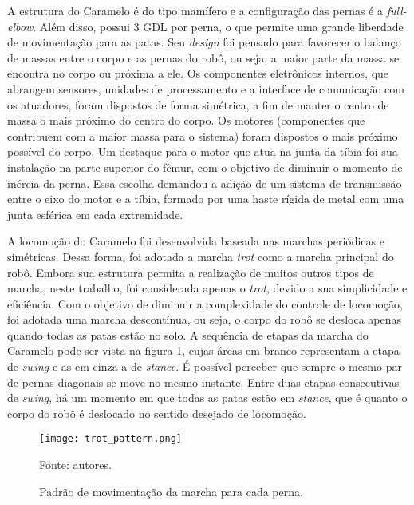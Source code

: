 \documentclass[conference]{IEEEtran}
\begin{document}
A estrutura do Caramelo é do tipo mamífero e a configuração das pernas é a \textit{full-elbow}. Além disso, possui 3 GDL por perna, o que permite uma grande liberdade de movimentação para as patas. Seu \textit{design} foi pensado para favorecer o balanço de massas entre o corpo e as pernas do robô, ou seja, a maior parte da massa se encontra no corpo ou próxima a ele. Os componentes eletrônicos internos, que abrangem sensores, unidades de processamento e a interface de comunicação com os atuadores, foram dispostos de forma simétrica, a fim de manter o centro de massa o mais próximo do centro do corpo. Os motores (componentes que contribuem com a maior massa para o sistema) foram dispostos o mais próximo possível do corpo. Um destaque para o motor que atua na junta da tíbia foi sua instalação na parte superior do fêmur, com o objetivo de diminuir o momento de inércia da perna. Essa escolha demandou a adição de um sistema de transmissão entre o eixo do motor e a tíbia, formado por uma haste rígida de metal com uma junta esférica em cada extremidade.

A locomoção do Caramelo foi desenvolvida baseada nas marchas periódicas e simétricas. Dessa forma, foi adotada a marcha \textit{trot} como a marcha principal do robô. Embora sua estrutura permita a realização de muitos outros tipos de marcha, neste trabalho, foi considerada apenas o \textit{trot}, devido a sua simplicidade e eficiência. Com o objetivo de diminuir a complexidade do controle de locomoção, foi adotada uma marcha descontínua, ou seja, o corpo do robô se desloca apenas quando todas as patas estão no solo. A sequência de etapas da marcha do Caramelo pode ser vista na figura \ref{fig:trot_pattern}, cujas áreas em branco representam a etapa de \textit{swing} e as em cinza a de \textit{stance}. É possível perceber que sempre o mesmo par de pernas diagonais se move no mesmo instante. Entre duas etapas consecutivas de \textit{swing}, há um momento em que todas as patas estão em \textit{stance}, que é quanto o corpo do robô é deslocado no sentido desejado de locomoção.

\begin{figure}[htbp]
  \centering
  \texttt{[image: trot\_pattern.png]}
  \vfill
  \caption{Padrão de movimentação da marcha para cada perna.}
  Fonte: autores.
  \label{fig:trot_pattern}
\end{figure}
\end{document}

